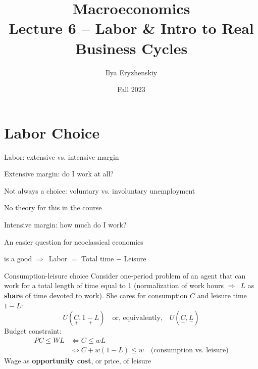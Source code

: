 \documentclass{beamer}
\title[PSME]{Macroeconomics\\ Lecture 6 -- Labor \& Intro to Real Business Cycles }
\author[I. Eryzhenskiy]{Ilya Eryzhenskiy}
\institute[BdF]{PSME Panth\'{e}on-Sorbonne Master in Economics}
\date[PSME macro]{Fall 2023}
\newcommand{\tb}[1]{{\color{blue}{\textbf{#1}}}}
\newenvironment{mytemize}
{\vfill\itemize[nolistsep,itemsep=\fill,label=\color{blue}{$\triangleright$}]}
  {\enditemize}
\newcommand{\rarr}{$\Rightarrow$\ }
\begin{document}
\begin{frame}
   \maketitle 
\end{frame}

\section{Labor Choice}

\begin{frame}{Labor: extensive vs. intensive margin}
    \begin{mytemize}
        \item Extensive margin: do I work at all?
            \begin{mytemize}
                \item Not always a choice: voluntary vs. involuntary unemployment
                \item No theory for this in the course
            \end{mytemize}
        \item Intensive margin: how much do I work?
        \begin{mytemize}
                \item An easier question for neoclassical economics
                \item \tb{Leisure} is a good \rarr Labor $=$ Total time $-$ Leisure
            \end{mytemize}
    \end{mytemize}
\end{frame}

\begin{frame}{Consumption-leisure choice}
  Consider one-period problem of an agent that can work for a total length of time equal to 1 (normalization of work hours \rarr $L$ as \textbf{share} of time devoted to work). She cares for consumption $C$ and leisure time $1-L$:
  \begin{equation*}
	U(\underset{+}{C}, \underset{+}{1-L}) \quad \text{or, equivalently,} \quad U(\underset{+}{C}, \underset{-}{L})
  \end{equation*} 
  \vfill 
  Budget constraint:
  \begin{align*}
	P C \leq  W L &\Leftrightarrow C \leq w L \\
		&\Leftrightarrow C + w (1-L) \leq w \quad \text{(consumption vs. leisure)}
  \end{align*} 
  Wage as \textbf{opportunity cost}, or price, of leisure
  

\end{frame}
\end{document}

